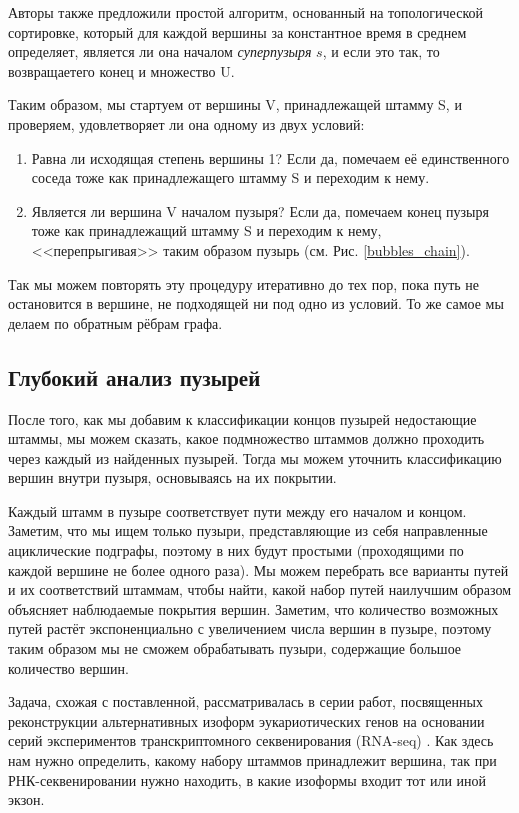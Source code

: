 \documentclass{spbau-diploma}
\begin{document}
Авторы также предложили простой алгоритм, основанный на топологической сортировке, который для каждой вершины за константное время в среднем определяет, является ли она началом \textit{суперпузыря} $s$, и если это так, то возвращаетего конец и множество U.

Таким образом, мы стартуем от вершины V, принадлежащей штамму S, и проверяем, удовлетворяет ли она одному из двух условий:
\begin{enumerate}
    \item Равна ли исходящая степень вершины 1? Если да, помечаем её единственного соседа тоже как принадлежащего штамму S и переходим к нему.
    \item Является ли вершина V началом пузыря? Если да, помечаем конец пузыря тоже как принадлежащий штамму S и переходим к нему, <<перепрыгивая>> таким образом пузырь (см. Рис. \ref{bubbles_chain}). 
\end{enumerate}
Так мы можем повторять эту процедуру итеративно до тех пор, пока путь не остановится в вершине, не подходящей ни под одно из условий. То же самое мы делаем по обратным рёбрам графа.

\subsection{Глубокий анализ пузырей}

После того, как мы добавим к классификации концов пузырей недостающие штаммы, мы можем сказать, какое подмножество штаммов должно проходить через каждый из найденных пузырей. Тогда мы можем уточнить классификацию вершин внутри пузыря, основываясь на их покрытии.

Каждый штамм в пузыре соответствует пути между его началом и концом. Заметим, что мы ищем только пузыри, представляющие из себя направленные ациклические подграфы, поэтому в них будут простыми (проходящими по каждой вершине не более одного раза). Мы можем перебрать все варианты путей и их соответствий штаммам, чтобы найти, какой набор путей наилучшим образом объясняет наблюдаемые покрытия вершин. Заметим, что количество возможных путей растёт экспоненциально с увеличением числа вершин в пузыре, поэтому таким образом мы не сможем обрабатывать пузыри, содержащие большое количество вершин.

Задача, схожая с поставленной, рассматривалась в серии работ, посвященных реконструкции альтернативных изоформ эукариотических генов на основании серий экспериментов транскриптомного секвенирования (RNA-seq) \cite{flipflop2, other_flows, flipflop1}. Как здесь нам нужно определить, какому набору штаммов принадлежит вершина, так при РНК-секвенировании нужно находить, в какие изоформы входит тот или иной экзон.
\end{document}
